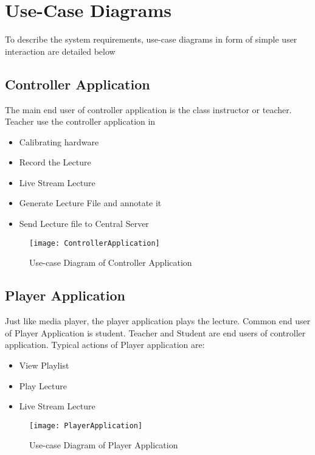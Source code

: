 \section{Use-Case Diagrams}
To describe the system requirements, use-case diagrams in form of simple user interaction are detailed below
\subsection{Controller Application}
The main end user of controller application is the class instructor or teacher. Teacher use the controller application in
\begin{itemize}

\item Calibrating hardware
\item Record the Lecture
\item Live Stream Lecture
\item Generate Lecture File and annotate it
\item Send Lecture file to Central Server


\end{itemize}

\begin{figure}[h]
  \centering
  \texttt{[image: ControllerApplication]}
  \caption{Use-case Diagram of Controller Application}
\end{figure}


\subsection{Player Application}
Just like media player, the player application plays the lecture. Common end user of Player Application is student. Teacher and Student are end users of controller application. Typical actions of Player application are:

\begin{itemize}

\item View Playlist
\item Play Lecture
\item Live Stream Lecture


\end{itemize}

\bigskip

\begin{figure}[h]
  \centering
  \texttt{[image: PlayerApplication]}
  \caption{Use-case Diagram of Player Application}
\end{figure}

